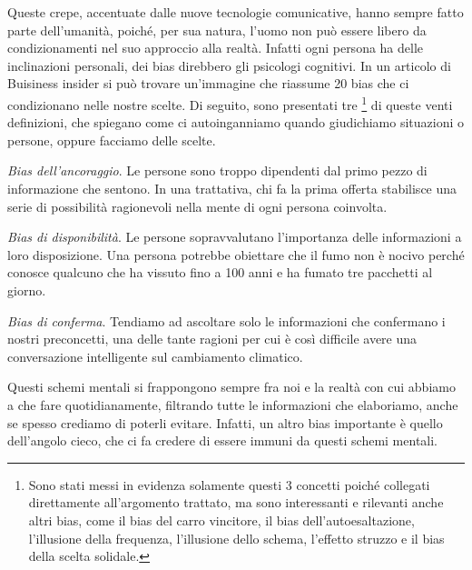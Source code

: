 \documentclass{article}
\begin{document}
 Queste crepe, accentuate dalle nuove tecnologie comunicative, hanno sempre fatto parte dell’umanità, poiché, per sua natura, l’uomo non può essere libero da condizionamenti nel suo approccio alla realtà. Infatti ogni persona ha delle inclinazioni personali, dei bias direbbero gli psicologi cognitivi. In un articolo di Buisiness insider \parencite{lee_20_nodate} si può trovare un’immagine che riassume 20 bias che ci condizionano nelle nostre scelte. Di seguito, sono presentati tre%
 \footnote{Sono stati messi in evidenza solamente questi 3 concetti poiché collegati direttamente all’argomento trattato, ma sono interessanti e rilevanti anche altri bias, come il bias del carro vincitore, il bias dell’autoesaltazione, l’illusione della frequenza, l’illusione dello schema, l’effetto struzzo e il bias della scelta solidale.} di queste venti definizioni, che spiegano come ci autoinganniamo quando giudichiamo situazioni o persone, oppure facciamo delle scelte.
 
 \vspace{0.5cm}
 
 \textit{Bias dell’ancoraggio}. Le persone sono troppo dipendenti dal primo pezzo di informazione che sentono. In una trattativa, chi fa la prima offerta stabilisce una serie di possibilità ragionevoli nella mente di ogni persona coinvolta.
 
 \vspace{0.5cm}
 
 \textit{Bias di disponibilità}. Le persone sopravvalutano l’importanza delle informazioni a loro disposizione. Una persona potrebbe obiettare che il fumo non è nocivo perché conosce qualcuno che ha vissuto fino a 100 anni e ha fumato tre pacchetti al giorno.
 
 \vspace{0.5cm}
 
 \textit{Bias di conferma}. Tendiamo ad ascoltare solo le informazioni che confermano i nostri preconcetti, una delle tante ragioni per cui è così difficile avere una conversazione intelligente sul cambiamento climatico.
 
 \vspace{0.5cm}
 
 Questi schemi mentali si frappongono sempre fra noi e la realtà con cui abbiamo a che fare quotidianamente, filtrando tutte le informazioni che elaboriamo, anche se spesso crediamo di poterli evitare. Infatti, un altro bias importante è quello dell’angolo cieco, che ci fa credere di essere immuni da questi schemi mentali.
 
\end{document}
